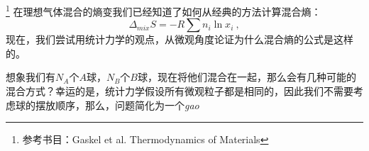 


\footnote{参考书目：Gaskel et al. Thermodynamics of Materials}
在理想气体混合的熵变我们已经知道了如何从经典的方法计算混合熵：
\begin{equation}
\Delta_{mix} S = - R \sum n_i \ln x_i~,
\end{equation}
现在，我们尝试用统计力学的观点，从微观角度论证为什么混合熵的公式是这样的。

想象我们有$N_A$个$A$球，$N_B$个$B$球，现在将他们混合在一起，那么会有几种可能的混合方式？幸运的是，统计力学假设所有微观粒子都是相同的，因此我们不需要考虑球的摆放顺序，那么，问题简化为一个\textsl{gao}

